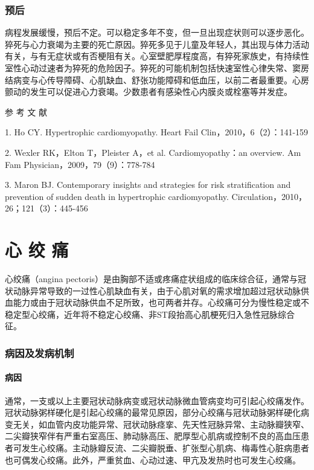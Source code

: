 \subsection{预后}

病程发展缓慢，预后不定。可以稳定多年不变，但一旦出现症状则可以逐步恶化。猝死与心力衰竭为主要的死亡原因。猝死多见于儿童及年轻人，其出现与体力活动有关，与有无症状或有否梗阻有关。心室壁肥厚程度高，有猝死家族史，有持续性室性心动过速者为猝死的危险因子。猝死的可能机制包括快速室性心律失常、窦房结病变与心传导障碍、心肌缺血、舒张功能障碍和低血压，以前二者最重要。心房颤动的发生可以促进心力衰竭。少数患者有感染性心内膜炎或栓塞等并发症。

\protect\hypertarget{text00308.html}{}{}

\hypertarget{text00308.htmlux5cux23CHP10-6-3}{}
参 考 文 献

1. Ho CY. Hypertrophic cardiomyopathy. Heart Fail
Clin，2010，6（2）：141-159

2. Wexler RK，Elton T，Pleister A，et al. Cardiomyopathy：an overview.
Am Fam Physician，2009，79（9）：778-784

3. Maron BJ. Contemporary insights and strategies for risk
stratification and prevention of sudden death in hypertrophic
cardiomyopathy. Circulation，2010，26；121（3）：445-456

\protect\hypertarget{text00309.html}{}{}

\chapter{心 绞 痛}

心绞痛（angina
pectoris）是由胸部不适或疼痛症状组成的临床综合征，通常与冠状动脉异常导致的一过性心肌缺血有关，由于心肌对氧的需求增加超过冠状动脉供血能力或由于冠状动脉供血不足所致，也可两者并存。心绞痛可分为慢性稳定或不稳定型心绞痛，近年将不稳定心绞痛、非ST段抬高心肌梗死归入急性冠脉综合征。

\subsection{病因及发病机制}

\subsubsection{病因}

通常，一支或以上主要冠状动脉病变或冠状动脉微血管病变均可引起心绞痛发作。冠状动脉粥样硬化是引起心绞痛的最常见原因，部分心绞痛与冠状动脉粥样硬化病变无关，如血管内皮功能异常、冠状动脉痉挛、先天性冠脉异常、主动脉瓣狭窄、二尖瓣狭窄伴有严重右室高压、肺动脉高压、肥厚型心肌病或控制不良的高血压患者可发生心绞痛。主动脉瓣反流、二尖瓣脱垂、扩张型心肌病、梅毒性心脏病患者也可偶发心绞痛。此外，严重贫血、心动过速、甲亢及发热时也可发生心绞痛。

